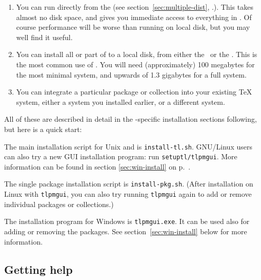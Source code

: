 \documentclass{article}
\begin{document}
\begin{enumerate}

\item You can run \TL{} directly from the  \DVD
(see section~\ref{sec:multiple-dist}, \p.\pageref{sec:multiple-dist}).
This takes almost no disk space, and gives you immediate access to
everything in \TL{}.  Of course performance will be worse than running
on local disk, but you may well find it useful.

\item You can install all or part of \TL{} to a local disk, from either
the \DVD\ or the  .  This is the most common use
of \TL.  You will need (approximately) 100 megabytes for the most
minimal system, and upwards of 1.3 gigabytes for a full system.

\item You can integrate a particular package or collection into your
existing \TeX{} system, either a \TL{} system you installed
earlier, or a different system.

\end{enumerate}

\noindent All of these are described in detail in the -specific
installation sections following, but here is a quick start:

\begin{itemize*}

\item The main installation script for Unix and \MacOSX{} is
\texttt{install-tl.sh}.
GNU/Linux users can also try a new GUI installation program:
run \texttt{setuptl/tlpmgui}. More information 
can be found in section \ref{sec:win-install} on 
p.~\pageref{sec:win-install}.

\item The single package installation script is \texttt{install-pkg.sh}.
(After installation on Linux with \texttt{tlpmgui}, you can also try
running \texttt{tlpmgui} again to add or remove individual packages or
collections.)

\item The installation program for Windows is \texttt{tlpmgui.exe}.
It can be used also for adding or removing the packages.
See section~\ref{sec:win-install} below for more information.

\end{itemize*}


\subsection{Getting help}
\label{sec:help}
\end{document}

